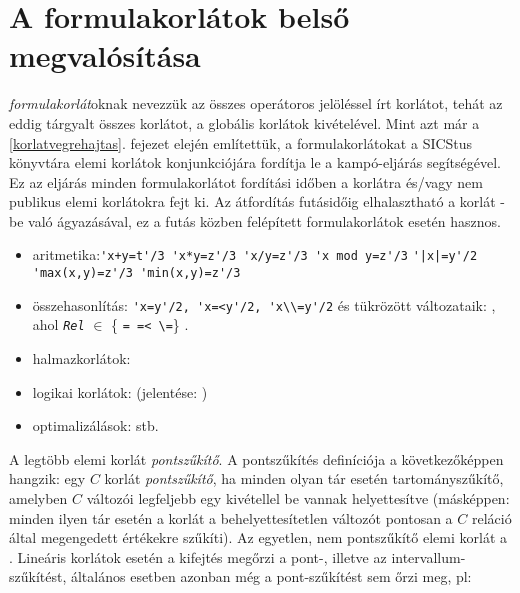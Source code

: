 \section{A formulakorlátok belső megvalósítása}
\label{korlatkif}

 \emph{formulakorlát}oknak nevezzük az összes operátoros
jelöléssel írt korlátot, tehát az eddig tárgyalt összes korlátot, a
globális korlátok kivételével.
\br
Mint azt már a \ref{korlatvegrehajtas}. fejezet elején említettük, a
formulakorlátokat a SICStus \clpfd könyvtára elemi korlátok konjunkciójára
fordítja le a  kampó-eljárás segítségével. Ez az
eljárás minden formulakorlátot fordítási időben a 
korlátra és/vagy nem publikus elemi korlátokra fejt ki. Az átfordítás
futásidőig elhalasztható a korlát -be való ágyazásával, ez
a futás közben felépített formulakorlátok esetén hasznos.

\begin{itemize}
\item aritmetika:\verb?'x+y=t'/3 'x*y=z'/3 'x/y=z'/3 'x mod y=z'/3?
\verb?'|x|=y'/2 'max(x,y)=z'/3 'min(x,y)=z'/3?
 \item összehasonlítás: \verb?'x=y'/2, 'x=<y'/2, 'x\\=y'/2?
és tükrözött változataik: ,
ahol {\tt\em Rel} $\in$ \{ \verb?= =< \=?\} .
\item halmazkorlátok: 
\item logikai korlátok:  (jelentése: )
\item optimalizálások:  stb.
\end{itemize}

\label{pontszukites}
A legtöbb elemi korlát \emph{pontszűkítő}. A pontszűkítés definíciója
a következőképpen hangzik: egy $C$ korlát \emph{pontszűkítő}, ha minden
olyan tár esetén tartományszűkítő, amelyben $C$ változói legfeljebb
egy kivétellel be vannak helyettesítve (másképpen: minden ilyen tár esetén
a korlát a behelyettesítetlen változót pontosan a $C$ reláció által
megengedett értékekre szűkíti). Az egyetlen, nem pontszűkítő elemi
korlát a .
\br
Lineáris korlátok esetén a kifejtés megőrzi a pont-, illetve az
intervallum-szűkítést, általános esetben azonban még a pont-szűkítést
sem őrzi meg, pl:

